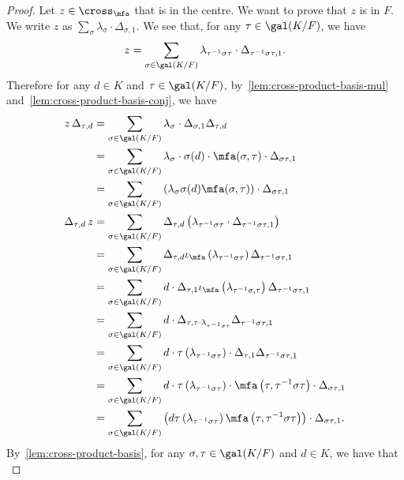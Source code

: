 \begin{proof}
  Let $z \in \cross_{\mfa}$ that is in the centre. We want to prove that $z$ is in $F$. We write $z$ as $\sum_{\sigma}\lambda_{\sigma}\cdot\Delta_{\sigma,1}$. We see that, for any $\tau \in \gal(K/F)$, we have
  \[
    z = \sum_{\sigma\in\gal(K/F)} \lambda_{\tau^{-1}\sigma\tau}\cdot\Delta_{\tau^{-1}\sigma\tau,1}.
  \]
  Therefore for any $d \in K$ and $\tau\in\gal(K/F)$, by~\cref{lem:cross-product-basis-mul} and~\cref{lem:cross-product-basis-conj}, we have
  \[
    \begin{aligned}
      z\, \Delta_{\tau,d}
      &= \sum_{\sigma\in\gal(K/F)}\lambda_{\sigma}\cdot\Delta_{\sigma, 1}\Delta_{\tau,d}\\
      &= \sum_{\sigma\in\gal(K/F)}\lambda_{\sigma}\cdot\sigma(d)\cdot \mfa(\sigma,\tau) \cdot \Delta_{\sigma\tau, 1}\\
      &= \sum_{\sigma\in\gal(K/F)}\left(\lambda_{\sigma}\sigma(d)\mfa(\sigma,\tau)\right)\cdot \Delta_{\sigma\tau,1}\\
      \Delta_{\tau,d}\, z
      &= \sum_{\sigma\in\gal(K/F)}\Delta_{\tau,d}\left(\lambda_{\tau^{-1}\sigma\tau}\cdot \Delta_{\tau^{-1}\sigma\tau, 1}\right)\\
      &= \sum_{\sigma\in\gal(K/F)}\Delta_{\tau,d}\iota_{\mfa}\left(\lambda_{\tau^{-1}\sigma\tau}\right)\Delta_{\tau^{-1}\sigma\tau, 1} \\
      &=\sum_{\sigma\in\gal(K/F)} d \cdot \Delta_{\tau, 1}\iota_{\mfa}\left(\lambda_{\tau^{-1}\sigma, \tau}\right)\Delta_{\tau^{-1}\sigma\tau, 1}\\
      &=\sum_{\sigma\in\gal(K/F)} d \cdot \Delta_{\tau, \tau\cdot \lambda_{\tau^{-1}\sigma\tau}}\Delta_{\tau^{-1}\sigma\tau, 1}\\
      &=\sum_{\sigma\in\gal(K/F)} d\cdot \tau\left(\lambda_{\tau^{-1}\sigma\tau}\right)\cdot \Delta_{\tau,1}\Delta_{\tau^{-1}\sigma\tau, 1}\\
      &= \sum_{\sigma\in\gal(K/F)}d\cdot \tau\left(\lambda_{\tau^{-1}\sigma\tau}\right)\cdot \mfa\left(\tau,\tau^{-1}\sigma\tau\right)\cdot \Delta_{\sigma\tau, 1}\\
      &= \sum_{\sigma\in\gal(K/F)}\left(d\tau\left(\lambda_{\tau^{-1}\sigma\tau}\right)\mfa\left(\tau,\tau^{-1}\sigma\tau\right)\right) \cdot \Delta_{\sigma\tau,1}.
    \end{aligned}
  \]
  By~\cref{lem:cross-product-basis}, for any $\sigma,\tau\in\gal(K/F)$ and $d\in K$, we have that
  \begin{equation}
    \label{eq:cross-product-central-eqn}

\end{equation}
\end{proof}
